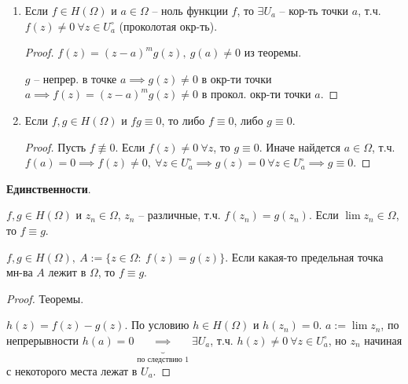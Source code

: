 \begin{consequence}
    \begin{enumerate}
        \item {
            Если $f \in H(\Omega)$ и $a \in \Omega$ -- ноль функции $f$, то $\exists U_a$ -- кор-ть точки $a$, т.ч. $f(z) \not = 0 \ \forall z \in U^{\circ}_a$ (проколотая окр-ть).

            \begin{proof}
                $f(z) = (z - a)^m g(z), \ g(a) \not = 0$ из теоремы.

                $g$ -- непрер. в точке $a \implies g(z) \not = 0$ в окр-ти точки $a \implies f(z) = (z - a)^m g(z) \not = 0$ в прокол. окр-ти точки $a$.
            \end{proof}
        }
        \item {
            Если $f, g \in H(\Omega)$ и $f g \equiv 0$, то либо $f \equiv 0$, либо $g \equiv 0$.

            \begin{proof}
                Пусть $f \not \equiv 0$. Если $f(z) \not = 0 \ \forall z$, то $g \equiv 0$. Иначе найдется $a \in \Omega$, т.ч. $f(a) = 0 \implies f(z) \not = 0, \ \forall z \in U^{\circ}_a \implies g(z) = 0 \ \forall z \in U^{\circ}_a \implies g \equiv 0$.
            \end{proof}
        }
    \end{enumerate}
\end{consequence}


\begin{theorem}
    \textbf{Единственности}.

    $f, g \in H(\Omega)$ и $z_n \in \Omega$, $z_n$ -- различные, т.ч. $f(z_n) = g(z_n)$. Если $\lim {z_n} \in \Omega$, то $f \equiv g$.
\end{theorem}

\begin{consequence}
    $f, g \in H(\Omega), \ A := \{ z \in \Omega: \ f(z) = g(z) \}$. Если какая-то предельная точка мн-ва $A$ лежит в $\Omega$, то $f \equiv g$.
\end{consequence}

\begin{proof}
    Теоремы.

    $h(z) = f(z) - g(z)$. По условию $h \in H(\Omega)$ и $h(z_n) = 0$. $a := \lim{z_n}$, по непрерывности $h(a) = 0 \underbrace{\implies}_{\text{по следствию 1}} \exists U_a$, т.ч. $h(z) \not = 0 \ \forall z \in U^{\circ}_a$, но $z_n$ начиная с некоторого места лежат в $U_a$.
\end{proof}




